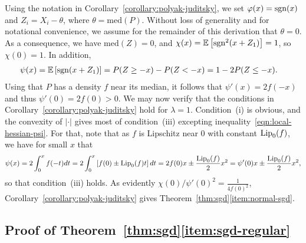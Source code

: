 Using the notation in Corollary~\ref{corollary:polyak-juditsky}, we set
$\varphi(x) = \mathrm{sgn}(x)$ and $Z_i = X_i - \theta$, where $\theta =
\mbox{med}(P)$. Without loss of generality and for notational convenience,
we assume for the remainder of this derivation that $\theta = 0$.
As a consequence, we have $\mbox{med}(Z) = 0$,
and $\chi(x) = \mathbb{E}\left[  \mathrm{sgn}^2(x+Z_1) \right]= 1$, so
$\chi(0) = 1$. In addition,
\begin{align*}
  \psi(x) & = \mathbb{E}\left[  \mathrm{sgn}(x+ Z_1) \right] =
  P(Z \ge -x) - P(Z < -x) = 1 - 2 P(Z \le -x).
\end{align*}
Using that $P$ has a density $f$ near its median, it follows that $\psi'(x)
= 2f(-x)$ and thus $\psi'(0) = 2f(0) > 0$.  We may now verify that the
conditions in Corollary~\ref{corollary:polyak-juditsky} hold for $\lambda =
1$. Condition~(i) is obvious, and the convexity of $|\cdot|$ gives most of
condition~(iii) excepting inequality~\eqref{eqn:local-hessian-psi}. For
that, note that as $f$ is Lipschitz near 0 with constant ${\rm \textup{Lip}}_0(f)$, we
have for small $x$ that
\begin{equation*}
  \psi(x) = 2 \int_0^x f(-t) dt
  = 2 \int_0^x \left[f(0) \pm {\rm \textup{Lip}}_0(f) t \right] dt
  = 2 f(0) x \pm \frac{{\rm \textup{Lip}}_0(f)}{2} x^2
  = \psi'(0) x \pm \frac{{\rm \textup{Lip}}_0(f)}{2} x^2,
\end{equation*}
so that condition~(iii) holds.
As evidently $\chi(0) / \psi'(0)^2 = \frac{1}{4 f(0)^2}$,
Corollary~\ref{corollary:polyak-juditsky} gives
Theorem~\ref{thm:sgd}\eqref{item:normal-sgd}.

\subsection{Proof of Theorem~\ref{thm:sgd}\eqref{item:sgd-regular}}


